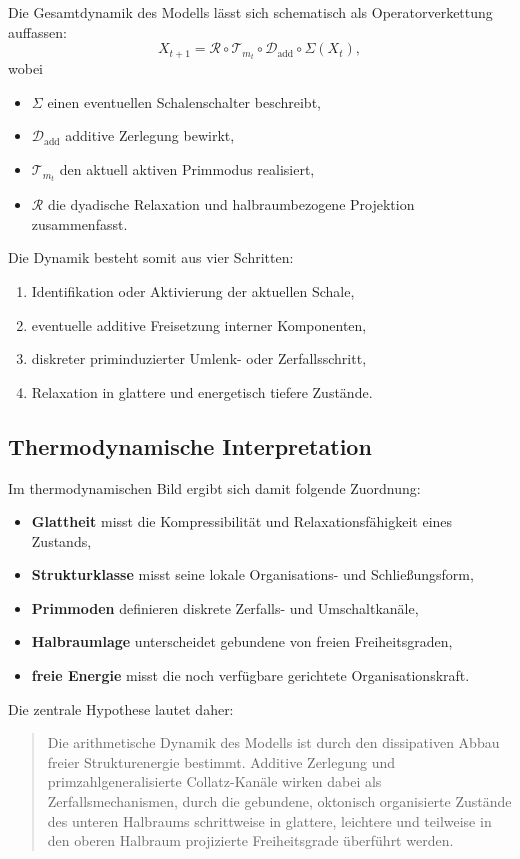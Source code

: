 \documentclass[11pt,a4paper]{article}
\theoremstyle{definition}
\begin{document}
Die Gesamtdynamik des Modells lässt sich schematisch als Operatorverkettung auffassen:
\[
X_{t+1}
=
\mathcal{R}\circ \mathcal{T}_{m_t}\circ \mathcal{D}_{\mathrm{add}}\circ \Sigma(X_t),
\]
wobei
\begin{itemize}
	\item $\Sigma$ einen eventuellen Schalenschalter beschreibt,
	\item $\mathcal{D}_{\mathrm{add}}$ additive Zerlegung bewirkt,
	\item $\mathcal{T}_{m_t}$ den aktuell aktiven Primmodus realisiert,
	\item $\mathcal{R}$ die dyadische Relaxation und halbraumbezogene Projektion zusammenfasst.
\end{itemize}

Die Dynamik besteht somit aus vier Schritten:
\begin{enumerate}
	\item Identifikation oder Aktivierung der aktuellen Schale,
	\item eventuelle additive Freisetzung interner Komponenten,
	\item diskreter priminduzierter Umlenk- oder Zerfallsschritt,
	\item Relaxation in glattere und energetisch tiefere Zustände.
\end{enumerate}

\subsection{Thermodynamische Interpretation}

Im thermodynamischen Bild ergibt sich damit folgende Zuordnung:
\begin{itemize}
	\item \textbf{Glattheit} misst die Kompressibilität und Relaxationsfähigkeit eines Zustands,
	\item \textbf{Strukturklasse} misst seine lokale Organisations- und Schließungsform,
	\item \textbf{Primmoden} definieren diskrete Zerfalls- und Umschaltkanäle,
	\item \textbf{Halbraumlage} unterscheidet gebundene von freien Freiheitsgraden,
	\item \textbf{freie Energie} misst die noch verfügbare gerichtete Organisationskraft.
\end{itemize}

Die zentrale Hypothese lautet daher:
\begin{quote}
	Die arithmetische Dynamik des Modells ist durch den dissipativen Abbau freier Strukturenergie bestimmt. Additive Zerlegung und primzahlgeneralisierte Collatz-Kanäle wirken dabei als Zerfallsmechanismen, durch die gebundene, oktonisch organisierte Zustände des unteren Halbraums schrittweise in glattere, leichtere und teilweise in den oberen Halbraum projizierte Freiheitsgrade überführt werden.
\end{quote}
\end{document}
